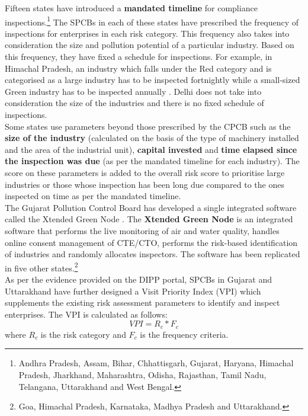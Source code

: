 \documentclass[a4paper, 12pt, twoside]{article}
\begin{document}
	Fifteen states have introduced a \textbf{mandated timeline} for compliance inspections.\footnote{Andhra Pradesh, Assam, Bihar, Chhattisgarh, Gujarat, Haryana, Himachal Pradesh, Jharkhand, Maharashtra, Odisha, Rajasthan, Tamil Nadu, Telangana, Uttarakhand and West Bengal.} The SPCBs in each of these states have prescribed the frequency of inspections for enterprises in each risk category. This frequency also takes into consideration the size and pollution potential of a particular industry. Based on this frequency, they have fixed a schedule for inspections. For example, in Himachal Pradesh, an industry which falls under the Red category and is categorised as a large industry has to be inspected fortnightly while a small-sized Green industry has to be inspected annually \parencite{HPPCB}. Delhi does not take into consideration the size of the industries and there is no fixed schedule of inspections. \\
	
	Some states use parameters beyond those prescribed by the CPCB such as the \textbf{size of the industry} (calculated on the basis of the type of machinery installed and the area of the industrial unit), \textbf{capital invested} and \textbf{time elapsed since the inspection was due} (as per the mandated timeline for each industry). The score on these parameters is added to the overall risk score to prioritise large industries or those whose inspection has been long due compared to the ones inspected on time as per the mandated timeline. \\
	
	The Gujarat Pollution Control Board has developed a single integrated software called the Xtended Green Node \parencite{GPCB}. The \textbf{Xtended Green Node} is an integrated software that performs the live monitoring of air and water quality, handles online consent management of CTE/CTO, performs the risk-based identification of industries and randomly allocates inspectors. The software has been replicated in five other states.\footnote{Goa, Himachal Pradesh, Karnataka, Madhya Pradesh and Uttarakhand.} \\
	
	As per the evidence provided on the DIPP portal, SPCBs in Gujarat \parencite{GPCB} and Uttarakhand \parencite{UKPCB} have further designed a Visit Priority Index (VPI) which supplements the existing risk assessment parameters to identify and inspect enterprises. The VPI is calculated as follows: $$VPI = R_c *F_c$$ where $R_c$ is the risk category and $F_c$ is the frequency criteria. \\
	
\end{document}
